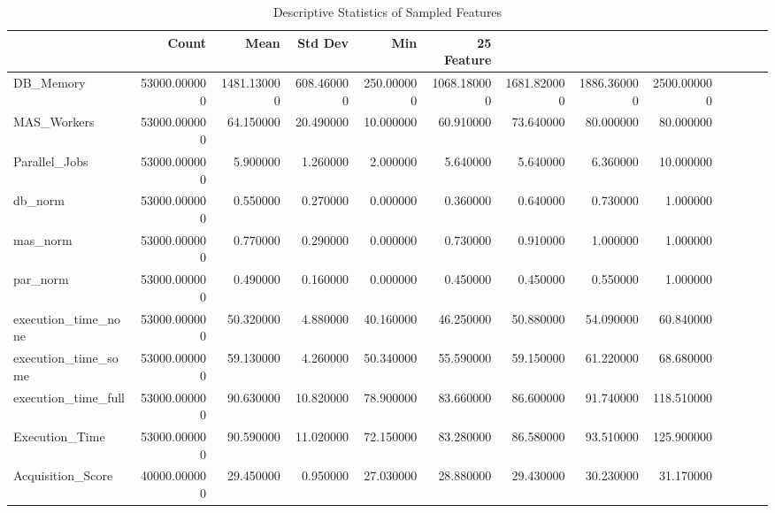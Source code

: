 \begin{table}
\caption{Descriptive Statistics of Sampled Features}
\label{tab:data_summary}
\begin{tabular}{lrrrrrrrr}
\toprule
 & Count & Mean & Std Dev & Min & 25%
Feature &  &  &  &  &  &  &  &  \\
\midrule
DB_Memory & 53000.000000 & 1481.130000 & 608.460000 & 250.000000 & 1068.180000 & 1681.820000 & 1886.360000 & 2500.000000 \\
MAS_Workers & 53000.000000 & 64.150000 & 20.490000 & 10.000000 & 60.910000 & 73.640000 & 80.000000 & 80.000000 \\
Parallel_Jobs & 53000.000000 & 5.900000 & 1.260000 & 2.000000 & 5.640000 & 5.640000 & 6.360000 & 10.000000 \\
db_norm & 53000.000000 & 0.550000 & 0.270000 & 0.000000 & 0.360000 & 0.640000 & 0.730000 & 1.000000 \\
mas_norm & 53000.000000 & 0.770000 & 0.290000 & 0.000000 & 0.730000 & 0.910000 & 1.000000 & 1.000000 \\
par_norm & 53000.000000 & 0.490000 & 0.160000 & 0.000000 & 0.450000 & 0.450000 & 0.550000 & 1.000000 \\
execution_time_none & 53000.000000 & 50.320000 & 4.880000 & 40.160000 & 46.250000 & 50.880000 & 54.090000 & 60.840000 \\
execution_time_some & 53000.000000 & 59.130000 & 4.260000 & 50.340000 & 55.590000 & 59.150000 & 61.220000 & 68.680000 \\
execution_time_full & 53000.000000 & 90.630000 & 10.820000 & 78.900000 & 83.660000 & 86.600000 & 91.740000 & 118.510000 \\
Execution_Time & 53000.000000 & 90.590000 & 11.020000 & 72.150000 & 83.280000 & 86.580000 & 93.510000 & 125.900000 \\
Acquisition_Score & 40000.000000 & 29.450000 & 0.950000 & 27.030000 & 28.880000 & 29.430000 & 30.230000 & 31.170000 \\
\bottomrule
\end{tabular}
\end{table}
